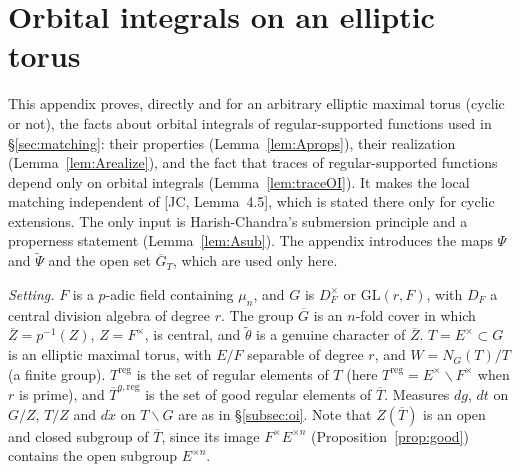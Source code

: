 \documentclass[12pt]{article}
\newcommand{\ov}[1]{\overline{#1}}
\newcommand{\reg}{\mathrm{reg}}
\newcommand{\GL}{\mathrm{GL}}
\newcommand{\Gb}{\ov{G}}
\newcommand{\Zb}{\ov{Z}}
\newcommand{\Tb}{\ov{T}}
\theoremstyle{plain}
\theoremstyle{definition}
\begin{document}
\appendix
\section{Orbital integrals on an elliptic torus}\label{app:oi}
This appendix proves, directly and for an arbitrary elliptic maximal torus (cyclic or not), the facts about orbital integrals of regular-supported functions used in \S\ref{sec:matching}: their properties (Lemma~\ref{lem:Aprops}), their realization (Lemma~\ref{lem:Arealize}), and the fact that traces of regular-supported functions depend only on orbital integrals (Lemma~\ref{lem:traceOI}). It makes the local matching independent of [JC, Lemma~4.5], which is stated there only for cyclic extensions. The only input is Harish-Chandra's submersion principle and a properness statement (Lemma~\ref{lem:Asub}). The appendix introduces the maps $\Psi$ and $\tilde\Psi$ and the open set $\Gb_T$, which are used only here.

\emph{Setting.} $F$ is a $p$-adic field containing $\mu_n$, and $G$ is $D_F^\times$ or $\GL(r,F)$, with $D_F$ a central division algebra of degree $r$. The group $\Gb$ is an $n$-fold cover in which $\Zb=p^{-1}(Z)$, $Z=F^\times$, is central, and $\tilde\theta$ is a genuine character of $\Zb$. $T=E^\times\subset G$ is an elliptic maximal torus, with $E/F$ separable of degree $r$, and $W=N_G(T)/T$ (a finite group). $T^{\reg}$ is the set of regular elements of $T$ (here $T^{\reg}=E^\times\smallsetminus F^\times$ when $r$ is prime), and $\Tb^{g,\reg}$ is the set of good regular elements of $\Tb$. Measures $dg$, $dt$ on $G/Z$, $T/Z$ and $d\dot x$ on $T\backslash G$ are as in \S\ref{subsec:oi}. Note that $Z(\Tb)$ is an open and closed subgroup of $\Tb$, since its image $F^\times E^{\times n}$ (Proposition~\ref{prop:good}) contains the open subgroup $E^{\times n}$.
\end{document}

